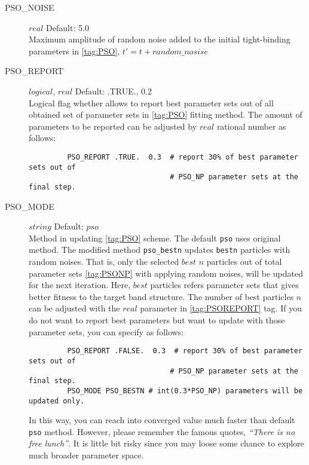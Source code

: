 \documentclass[a4paper,12pt]{scrartcl}
\makeatletter
\def\namedlabel#1#2{\begingroup
    #2%
    \def\@currentlabel{#2}%
    \phantomsection\label{#1}\endgroup
}
\makeatother
\begin{document}
\begin{description}
	 \item[\namedlabel{tag:PSONOISE}{PSO\_NOISE}] $real$ Default: 5.0 \\
		Maximum amplitude of random noise added to the initial tight-binding parameters in \ref{tag:PSO}, $t' = t + random\_nosise$

	 \item[\namedlabel{tag:PSOREPORT}{PSO\_REPORT}] $logical$, $real$ Default: .TRUE., 0.2 \\
		Logical flag whether allows to report best parameter sets out of all obtained set of parameter sets in \ref{tag:PSO} fitting method. The amount of parameters to be reported can be adjusted by $real$ rational number as follows:
		
		\begin{verbatim}
		 PSO_REPORT .TRUE.  0.3  # report 30% of best parameter sets out of 
		                         # PSO_NP parameter sets at the final step.
		\end{verbatim}
	
	 \item[\namedlabel{tag:PSOMODE}{PSO\_MODE}] $string$ Default: $pso$ \\
		Method in updating \ref{tag:PSO} scheme. The default \texttt{pso} uses original method. The modified method \texttt{pso\_bestn} updates \texttt{bestn} particles with random noises. That is, only the selected $best$ $n$ particles out of total parameter sets \ref{tag:PSONP} with applying random noises, will be updated for the next iteration. Here, $best$ particles refers parameter sets that gives better fitness to the target band structure. The number of best particles $n$ can be adjusted with the $real$ parameter in \ref{tag:PSOREPORT} tag. If you do not want to report best parameters but want to update with those parameter sets, you can specify as follows: 
		
		\begin{verbatim}
		 PSO_REPORT .FALSE.  0.3  # report 30% of best parameter sets out of 
		                         # PSO_NP parameter sets at the final step.
		 PSO_MODE PSO_BESTN # int(0.3*PSO_NP) parameters will be updated only.
       \end{verbatim}
		
		In this way, you can reach into converged value much faster than default \texttt{pso} method. However, please remember the famous quotes, \emph{``There is no free lunch''}. It is little bit risky since you may loose some chance to explore much broader parameter space. 
	 	 


\end{description}
\end{document}
